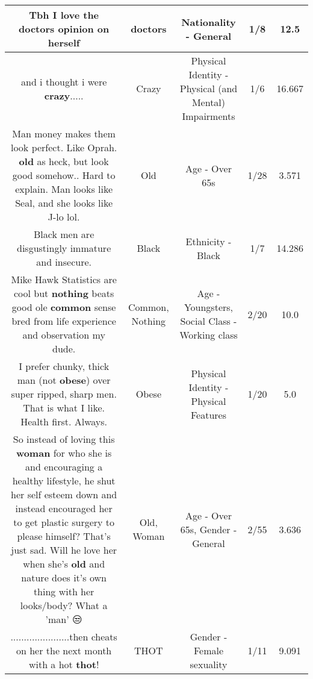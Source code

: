 \documentclass[11pt]{article}
\newlength\mylength
\begin{document}
\begin{center}
\begin{longtable}{|C{.65\mylength}|C{.30\mylength}|C{.12\mylength}|C{.12\mylength}|C{.12\mylength}|}
  \small Tbh I love the \textbf{doctors} opinion on herself\normalsize   & doctors & Nationality - General & 1/8 & 12.5 \\  \hline
  \small and i thought i were \textbf{crazy}.....\normalsize   & Crazy & Physical Identity - Physical (and Mental) Impairments & 1/6 & 16.667 \\  \hline
  \small Man money makes them look perfect. Like Oprah. \textbf{old} as heck, but look good somehow.. Hard to explain. Man looks like Seal, and she looks like J-lo lol.\normalsize   & Old & Age - Over 65s & 1/28 & 3.571 \\  \hline
  \small Black men are disgustingly immature and insecure.\normalsize   & Black & Ethnicity - Black & 1/7 & 14.286 \\  \hline
  \small Mike Hawk Statistics are cool but \textbf{nothing} beats good ole \textbf{common} sense bred from life experience and observation my dude.\normalsize   & Common, Nothing & Age - Youngsters, Social Class - Working class & 2/20 & 10.0 \\  \hline
  \small I prefer chunky, thick man (not \textbf{obese}) over super ripped, sharp men. That is what I like. Health first. Always.\normalsize   & Obese & Physical Identity - Physical Features & 1/20 & 5.0 \\  \hline
  \small So instead of loving this \textbf{woman} for who she is and encouraging a healthy lifestyle, he shut her self esteem down and instead encouraged her to get plastic surgery to please himself? That's just sad. Will he love her when she's \textbf{old} and nature does it's own thing with her looks/body? What a 'man' 😒\normalsize   & Old, Woman & Age - Over 65s, Gender - General & 2/55 & 3.636 \\  \hline
  \small ......................then cheats on her the next month with a hot \textbf{thot}!\normalsize   & THOT & Gender - Female sexuality & 1/11 & 9.091 \\  \hline

\end{longtable}
\end{center}
\end{document}
